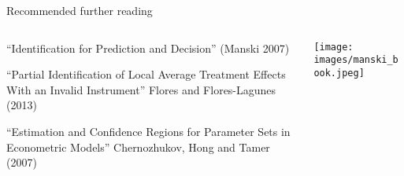 \documentclass[notes,11pt, aspectratio=169]{beamer}
\newenvironment{wideitemize}{\itemize\addtolength{\itemsep}{10pt}}{\enditemize}
\begin{document}
  
\begin{frame}{Recommended further reading}
      \begin{columns}[onlytextwidth, T] %
        \begin{column}{.5\textwidth}
          \begin{wideitemize}
          \item ``Identification for Prediction and Decision'' (Manski 2007)
          \item ``Partial Identification of Local Average Treatment
            Effects With an Invalid Instrument'' Flores and
            Flores-Lagunes (2013)
          \item ``Estimation and Confidence Regions for Parameter Sets
            in Econometric Models'' Chernozhukov, Hong and Tamer
            (2007)
          \end{wideitemize}
      \end{column}%
      \hfill%
      \begin{column}{.5\textwidth}
        \texttt{[image: images/manski\_book.jpeg]}
      \end{column}%
    \end{columns}
\end{frame}
\end{document}
